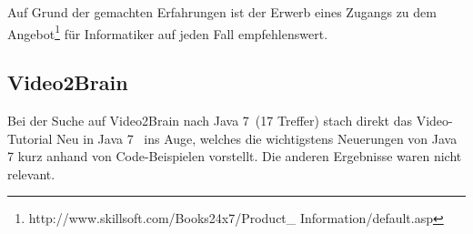 Auf Grund der gemachten Erfahrungen ist der Erwerb eines Zugangs zu dem Angebot\footnote{http://www.skillsoft.com/Books24x7/Product\_ Information/default.asp} für Informatiker auf jeden Fall empfehlenswert.

\subsection{Video2Brain}
Bei der Suche auf Video2Brain nach \glqq Java 7\grqq~(17 Treffer) stach direkt das Video-Tutorial \glqq Neu in Java 7\grqq\cite{v2bJava7}~
ins Auge, welches die wichtigstens Neuerungen von Java 7 kurz anhand von Code-Beispielen vorstellt.
Die anderen Ergebnisse waren nicht relevant.
%




